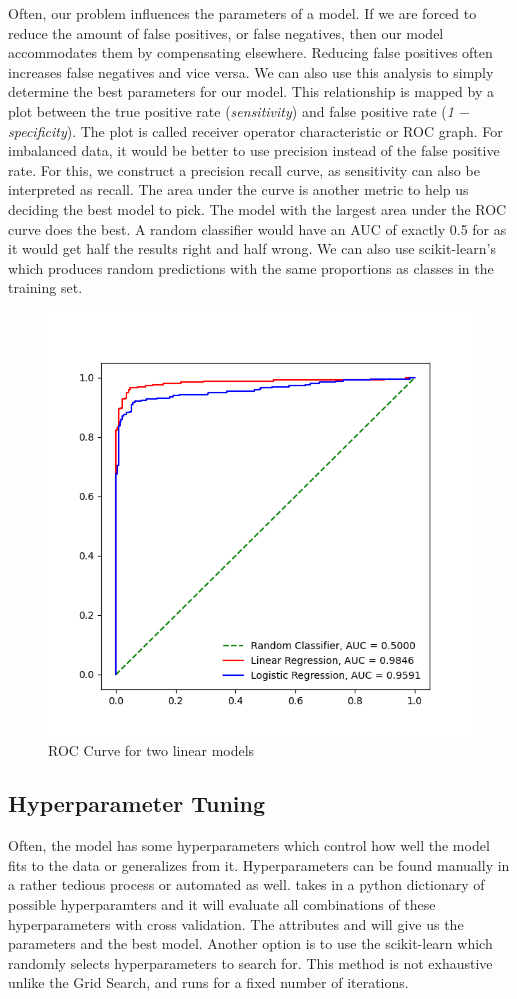 \documentclass{article}
\newcommand{\code}[1]{{\fontfamily{zi4} \selectfont{#1}}}
\begin{document}
Often, our problem influences the parameters of a model. If we are forced to reduce the amount of false positives, or false negatives, then our model accommodates them by compensating elsewhere. Reducing false positives often increases false negatives and vice versa. We can also use this analysis to simply determine the best parameters for our model. This relationship is mapped by a plot between the true positive rate (\textit{sensitivity}) and false positive rate (\textit{1 $-$ specificity}). The plot is called receiver operator characteristic or ROC graph. For imbalanced data, it would be better to use precision instead of the false positive rate. For this, we construct a precision recall curve, as sensitivity can also be interpreted as recall. The area under the curve is another metric to help us deciding the best model to pick. The model with the largest area under the ROC curve does the best. A random classifier would have an AUC of exactly 0.5 for as it would get half the results right and half wrong. We can also use scikit-learn's \code{DummyClasssifier} which produces random predictions with the same proportions as classes in the training set.

\begin{figure}[H]
\includegraphics[width=0.7\linewidth]{Images/roc_curve.png}
\centering
\caption{ROC Curve for two linear models}
\end{figure}

\subsection{Hyperparameter Tuning}
Often, the model has some hyperparameters which control how well the model fits to the data or generalizes from it. Hyperparameters can be found manually in a rather tedious process or automated as well. \code{sklearn.model\_selection.GridSearchCV} takes in a python dictionary of possible hyperparamters and it will evaluate all combinations of these hyperparameters with cross validation. The attributes \code{best\_params\_} and \code{best\_estimator\_} will give us the parameters and the best model. Another option is to use the scikit-learn \code{RandomizedSearchCV} which randomly selects hyperparameters to search for. This method is not exhaustive unlike the Grid Search, and runs for a fixed number of iterations.
\end{document}
